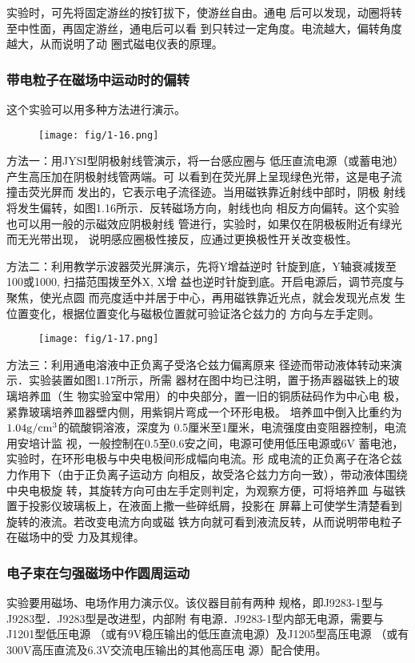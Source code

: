 实验时，可先将固定游丝的按钉拔下，使游丝自由。通电
后可以发现，动圈将转至中性面，再固定游丝，通电后可以看
到只转过一定角度。电流越大，偏转角度越大，从而说明了动
圈式磁电仪表的原理。

\subsubsection{带电粒子在磁场中运动时的偏转}
这个实验可以用多种方法进行演示。
\begin{figure}[htp]
    \centering
\texttt{[image: fig/1-16.png]}
    \caption{}
\end{figure}

方法一：用JYSI型阴极射线管演示，将一台感应圈与
低压直流电源（或蓄电池）产生高压加在阴极射线管两端。可
以看到在荧光屏上呈现绿色光带，这是电子流撞击荧光屏而
发出的，它表示电子流径迹。当用磁铁靠近射线中部时，阴极
射线将发生偏转，如图1.16所示．反转磁场方向，射线也向
相反方向偏转。这个实验也可以用一般的示磁效应阴极射线
管进行，实验时，如果仅在阴极板附近有绿光而无光带出现，
说明感应圈极性接反，应通过更换极性开关改变极性。

方法二：利用教学示波器荧光屏演示，先将Y增益逆时
针旋到底，Y轴衰减拨至100或1000, 扫描范围拨至外X, X增
益也逆时针旋到底。开启电源后，调节亮度与聚焦，使光点圆
而亮度适中并居于中心，再用磁铁靠近光点，就会发现光点发
生位置变化，根据位置变化与磁极位置就可验证洛仑兹力的
方向与左手定则。
\begin{figure}[htp]
    \centering
\texttt{[image: fig/1-17.png]}
    \caption{}
\end{figure}

方法三：利用通电溶液中正负离子受洛仑兹力偏离原来
径迹而带动液体转动来演示．实验装置如图1.17所示，所需
器材在图中均已注明，置于扬声器磁铁上的玻璃培养皿（生
物实验室中常用）的中央部分，置一旧的铜质砝码作为中心电
极，紧靠玻璃培养皿器壁内侧，用紫铜片弯成一个环形电极。
培养皿中倒入比重约为$1.04{\rm g/cm^3}$的硫酸铜溶液，深度为
0.5厘米至1厘米，电流强度由变阻器控制，电流用安培计监
视，一般控制在0.5至0.6安之间，电源可使用低压电源或6V
蓄电池，实验时，在环形电极与中央电极间形成幅向电流。形
成电流的正负离子在洛仑兹力作用下（由于正负离子运动方
向相反，故受洛仑兹力方向一致），带动液体围绕中央电极旋
转，其旋转方向可由左手定则判定，为观察方便，可将培养皿
与磁铁置于投影仪玻璃板上，在液面上撒一些碎纸屑，投影在
屏幕上可使学生清楚看到旋转的液流。若改变电流方向或磁
铁方向就可看到液流反转，从而说明带电粒子在磁场中的受
力及其规律。

\subsubsection{电子束在匀强磁场中作圆周运动}
实验要用磁场、电场作用力演示仪。该仪器目前有两种
规格，即J9283-1型与J9283型．J9283型是改进型，内部附
有电源．J9283-1型内部无电源，需要与J1201型低压电源
（或有9V稳压输出的低压直流电源）及J1205型高压电源
（或有300V高压直流及6.3V交流电压输出的其他高压电
源）配合使用。

